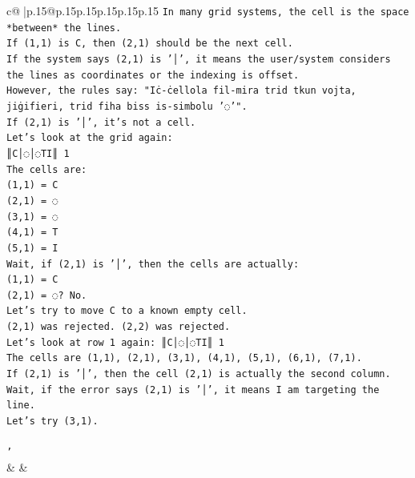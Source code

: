 \documentclass{article}
\begin{document}
{\begin{supertabular}{c@{$\;$}|p{.15\linewidth}@{}p{.15\linewidth}p{.15\linewidth}p{.15\linewidth}p{.15\linewidth}p{.15\linewidth}}
{{{\texttt{In many grid systems, the cell is the space *between* the lines.} \\
\texttt{If (1,1) is C, then (2,1) should be the next cell.} \\
\texttt{If the system says (2,1) is '│', it means the user/system considers the lines as coordinates or the indexing is offset.} \\
\texttt{However, the rules say: "Iċ{-}ċellola fil{-}mira trid tkun vojta, jiġifieri, trid fiha biss is{-}simbolu '◌'".} \\
\texttt{If (2,1) is '│', it's not a cell.} \\
\texttt{Let's look at the grid again:} \\
\texttt{║C│◌│◌TI║ 1} \\
\texttt{The cells are:} \\
\texttt{(1,1) = C} \\
\texttt{(2,1) = ◌} \\
\texttt{(3,1) = ◌} \\
\texttt{(4,1) = T} \\
\texttt{(5,1) = I} \\
\texttt{Wait, if (2,1) is '│', then the cells are actually:} \\
\texttt{(1,1) = C} \\
\texttt{(2,1) = ◌? No.} \\
\texttt{Let's try to move C to a known empty cell.} \\
\texttt{(2,1) was rejected. (2,2) was rejected.} \\
\texttt{Let's look at row 1 again: ║C│◌│◌TI║ 1} \\
\texttt{The cells are (1,1), (2,1), (3,1), (4,1), (5,1), (6,1), (7,1).} \\
\texttt{If (2,1) is '│', then the cell (2,1) is actually the second column.} \\
\texttt{Wait, if the error says (2,1) is '│', it means I am targeting the line.} \\
\texttt{Let's try (3,1).} \\
\\ 
\texttt{'} \\
            }
        }
    }
    & & \\ \\


\end{supertabular}}
\end{document}

